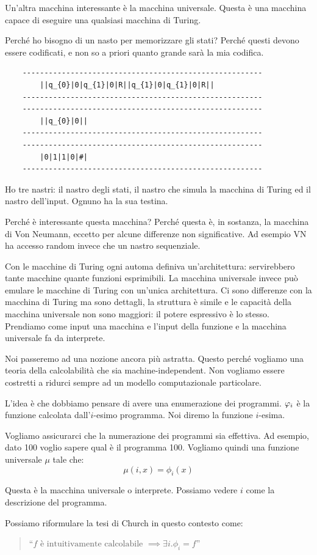 Un'altra macchina interessante è la macchina universale. Questa è una macchina capace di eseguire
una qualsiasi macchina di Turing.

Perché ho bisogno di un nasto per memorizzare gli stati? Perché questi devono essere codificati, e
non so a priori quanto grande sarà la mia codifica.

\begin{verbatim}
    -------------------------------------------------------
        ||q_{0}|0|q_{1}|0|R||q_{1}|0|q_{1}|0|R||
    -------------------------------------------------------
    -------------------------------------------------------
        ||q_{0}|0||
    -------------------------------------------------------
    -------------------------------------------------------
        |0|1|1|0|#|
    -------------------------------------------------------
\end{verbatim}

Ho tre nastri: il nastro degli stati, il nastro che simula la macchina di Turing ed il nastro
dell'input. Ognuno ha la sua testina.

Perché è interessante questa macchina? Perché questa è, in sostanza, la macchina di Von Neumann,
eccetto per alcune differenze non significative. Ad esempio VN ha accesso random invece che un nastro
sequenziale.

Con le macchine di Turing ogni automa definiva un'architettura: servirebbero tante macchine quante
funzioni esprimibili. La macchina universale invece può emulare le macchine di Turing con un'unica
architettura. Ci sono differenze con la macchina di Turing ma sono dettagli, la struttura è simile e
le capacità della macchina universale non sono maggiori: il potere espressivo è lo stesso.
Prendiamo come input una macchina e l'input della funzione e la macchina universale fa da
interprete.

Noi passeremo ad una nozione ancora più astratta. Questo perché vogliamo una teoria della
calcolabilità che sia machine-independent. Non vogliamo essere costretti a ridurci sempre ad un
modello computazionale particolare.

L'idea è che dobbiamo pensare di avere una enumerazione dei programmi. $\varphi_{i}$ è la funzione
calcolata dall'$i$-esimo programma. Noi diremo la funzione $i$-esima.

Vogliamo assicurarci che la numerazione dei programmi sia effettiva. Ad esempio, dato 100 voglio
sapere qual è il programma 100. Vogliamo quindi una funzione universale $\mu$ tale che:
\begin{equation*}
    \mu(i,x) = \phi_{i}(x)
\end{equation*}

Questa è la macchina universale o interprete. Possiamo vedere $i$ come la descrizione del programma.

Possiamo riformulare la tesi di Church in questo contesto come:
\begin{quote}
    ``$f \text{ è intuitivamente calcolabile } \implies \exists i. \phi_{i} = f$''
\end{quote}
